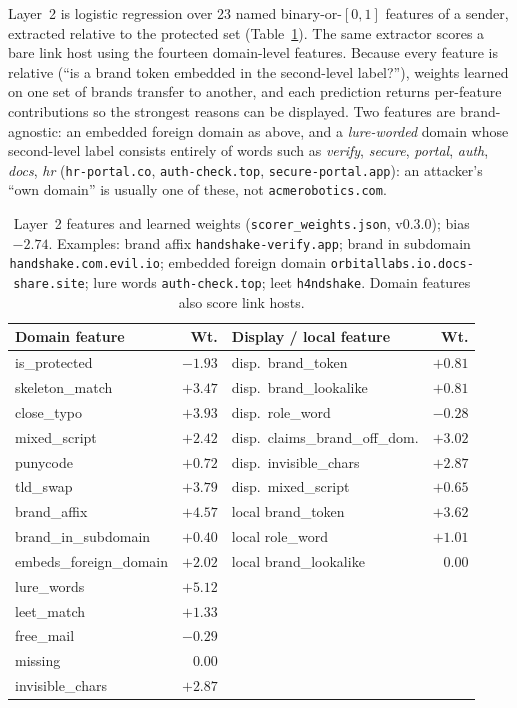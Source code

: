 \documentclass[10pt,twocolumn]{article}
\newcommand{\code}[1]{\texttt{#1}}
\begin{document}
Layer~2 is logistic regression over 23 named binary-or-$[0,1]$ features of a sender, extracted relative to the protected set (Table~\ref{tab:features}). The same extractor scores a bare link host using the fourteen domain-level features. Because every feature is relative (``is a brand token embedded in the second-level label?''), weights learned on one set of brands transfer to another, and each prediction returns per-feature contributions so the strongest reasons can be displayed. Two features are brand-agnostic: an embedded foreign domain as above, and a \emph{lure-worded} domain whose second-level label consists entirely of words such as \emph{verify}, \emph{secure}, \emph{portal}, \emph{auth}, \emph{docs}, \emph{hr} (\code{hr-portal.co}, \code{auth-check.top}, \code{secure-portal.app}): an attacker's ``own domain'' is usually one of these, not \code{acmerobotics.com}.

\begin{table}[t]
\centering\small
\caption{Layer~2 features and learned weights (\code{scorer\_weights.json}, v0.3.0); bias $-2.74$. Examples: brand affix \code{handshake-verify.app}; brand in subdomain \code{handshake.com.evil.io}; embedded foreign domain \code{orbitallabs.io.docs-share.site}; lure words \code{auth-check.top}; leet \code{h4ndshake}. Domain features also score link hosts.}
\label{tab:features}
\scriptsize\setlength{\tabcolsep}{2pt}
\begin{tabular}{@{}lr@{\hspace{6pt}}lr@{}}
\toprule
Domain feature & Wt. & Display / local feature & Wt. \\
\midrule
is\_protected & $-1.93$ & disp.\ brand\_token & $+0.81$ \\
skeleton\_match & $+3.47$ & disp.\ brand\_lookalike & $+0.81$ \\
close\_typo & $+3.93$ & disp.\ role\_word & $-0.28$ \\
mixed\_script & $+2.42$ & disp.\ claims\_brand\_off\_dom. & $+3.02$ \\
punycode & $+0.72$ & disp.\ invisible\_chars & $+2.87$ \\
tld\_swap & $+3.79$ & disp.\ mixed\_script & $+0.65$ \\
brand\_affix & $+4.57$ & local brand\_token & $+3.62$ \\
brand\_in\_subdomain & $+0.40$ & local role\_word & $+1.01$ \\
embeds\_foreign\_domain & $+2.02$ & local brand\_lookalike & $0.00$ \\
lure\_words & $+5.12$ & & \\
leet\_match & $+1.33$ & & \\
free\_mail & $-0.29$ & & \\
missing & $0.00$ & & \\
invisible\_chars & $+2.87$ & & \\
\bottomrule
\end{tabular}
\end{table}
\end{document}

